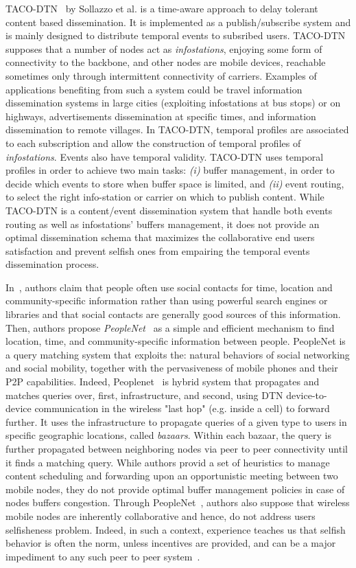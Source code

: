 TACO-DTN~\cite{TACODTN} by Sollazzo et al. is a time-aware approach to delay tolerant content based dissemination. It is implemented as a publish/subscribe system and is mainly designed to distribute temporal events to subsribed users. TACO-DTN supposes that a number of nodes act as \emph{infostations}, enjoying some form of connectivity to the backbone, and other nodes are mobile devices, reachable sometimes only through intermittent connectivity of carriers. Examples of applications benefiting from such a system could be travel information dissemination systems in  large cities (exploiting infostations at bus stops) or on highways, advertisements dissemination at specific times, and information dissemination to remote villages. In TACO-DTN, temporal profiles are associated to each subscription and allow the construction of temporal profiles of \emph{infostations}. Events also have temporal validity. TACO-DTN uses temporal profiles in order to achieve two main tasks: \emph{(i)} buffer management, in order to decide which events to store when buffer space is limited, and \emph{(ii)} event routing, to select the right info-station or carrier on which to publish content. While TACO-DTN is a content/event dissemination system that handle both events routing as well as infostations' buffers management, it does not provide an optimal dissemination schema that maximizes the collaborative end users satisfaction and prevent selfish ones from empairing the temporal events dissemination process.

In~\cite{Peoplenet}, authors claim that people often use social contacts for time, location and community-specific information rather than using powerful search engines or libraries and that social contacts are generally good sources of this information. Then, authors propose  \emph{PeopleNet}~\cite{Peoplenet} as a simple and efficient mechanism to find location, time, and community-specific information between people. PeopleNet is a query matching system that exploits the: natural behaviors of social networking and social mobility, together with the pervasiveness of mobile phones and their P2P capabilities. Indeed, Peoplenet~\cite{Peoplenet} is hybrid system that propagates and matches queries over, first, infrastructure, and second, using DTN device-to-device communication in the wireless "last hop" (e.g. inside a cell) to forward further. It uses the  infrastructure to propagate queries of a given type to users in specific geographic locations, called \emph{bazaars}. Within each bazaar, the query is further propagated between neighboring nodes via peer to peer connectivity until it finds a matching query. While authors provid a set of heuristics to manage content scheduling and forwarding upon an opportunistic meeting between two mobile nodes, they do not provide optimal buffer management policies in case of nodes buffers congestion. Through PeopleNet~\cite{Peoplenet}, authors also suppose that wireless mobile nodes are inherently collaborative and hence, do not address users selfisheness problem. Indeed, in such a context, experience teaches us that selfish behavior is often the norm, unless incentives are provided, and can be a major impediment to any such peer to peer system~\cite{NashEquilibria}.
  
